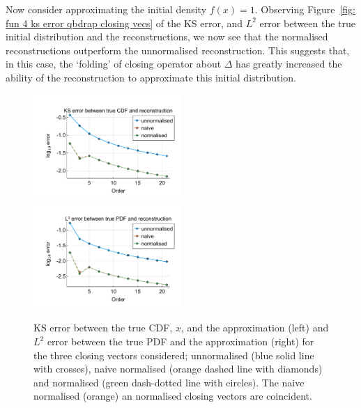Now consider approximating the initial density \(f(x)=1\). Observing Figure~\ref{fig: fun 4 ks error qbdrap closing vecs} of the KS error, and \(L^2\) error between the true initial distribution and the reconstructions, we now see that the normalised reconstructions outperform the unnormalised reconstruction. This suggests that, in this case, the `folding' of closing operator about \(\Delta\) has greatly increased the ability of the reconstruction to approximate this initial distribution. 
\begin{figure}
	\centering
	\includegraphics[width=0.5\textwidth,trim={1.25cm 0.8cm 0.25cm 1.25cm},clip]{chapter5/figs/qbdrap_closing_vec/fun4/ks_error_formatted.pdf}%
	\includegraphics[width=0.5\textwidth,trim={1.25cm 0.8cm 0.25cm 1.25cm},clip]{chapter5/figs/qbdrap_closing_vec/fun4/l2_pdf_error_formatted.pdf}
	\caption{KS error between the true CDF, \(x\), and the approximation (left) and \(L^2\) error between the true PDF and the approximation (right) for the three closing vectors considered; unnormalised (blue solid line with crosses), naive normalised (orange dashed line with diamonds) and normalised (green dash-dotted line with circles). The naive normalised (orange) an normalised closing vectors are coincident.}
\end{figure}

